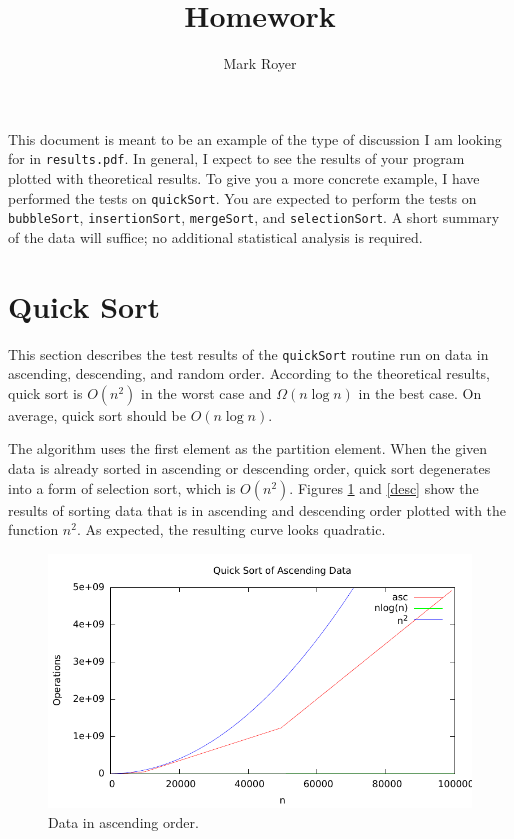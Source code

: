 \documentclass[twocolumn]{article}
\title{Homework}
\author{Mark Royer}
\date{}
\newcommand{\size}{.85}
\begin{document}
\maketitle

This document is meant to be an example of the type of discussion I am
looking for in \texttt{results.pdf}.  In general, I expect to see the
results of your program plotted with theoretical results.  To give you
a more concrete example, I have performed the tests on
\texttt{quickSort}. You are expected to perform the tests on
\texttt{bubbleSort}, \texttt{insertionSort}, \texttt{mergeSort}, and
\texttt{selectionSort}.  A short summary of the data will
suffice; no additional statistical analysis is required.


\section*{Quick Sort}

This section describes the test results of the
\texttt{quickSort} routine run on data in ascending, descending, and random
order. According to the theoretical results, quick sort is $O(n^2)$ in the
worst case and $\Omega(n\log n)$ in the best case.  On average, quick
sort should be $O(n\log n)$.

The algorithm uses the first element as the partition element.  When
the given data is already sorted in ascending or descending order,
quick sort degenerates into a form of selection sort, which is
$O(n^2)$.  Figures \ref{asc} and \ref{desc} show the results of
sorting data that is in ascending and descending order plotted with the function
$n^2$. As expected, the resulting curve looks quadratic.

\begin{figure}[h]
 \centerline{\includegraphics[width=\size\columnwidth]{qsasc}}
 \caption{Data in ascending order.}\label{asc}
\end{figure}
\end{document}

